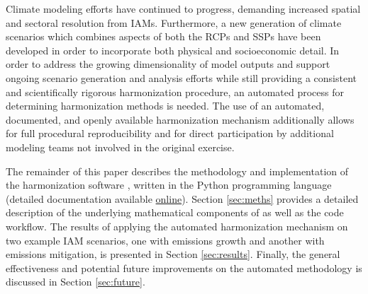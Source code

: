 Climate modeling efforts have continued to progress, demanding increased spatial
and sectoral resolution from IAMs. Furthermore, a new generation of climate
scenarios which combines aspects of both the RCPs and SSPs have been developed
in order to incorporate both physical and socioeconomic detail. In order to
address the growing dimensionality of model outputs and support ongoing scenario
generation and analysis efforts while still providing a consistent and
scientifically rigorous harmonization procedure, an automated process for
determining harmonization methods is needed. The use of an automated,
documented, and openly available harmonization mechanism additionally allows for
full procedural reproducibility and for direct participation by additional
modeling teams not involved in the original exercise.

The remainder of this paper describes the methodology and implementation of the
harmonization software  \cite{matthew_gidden_2017_802832}, written
in the Python programming language (detailed documentation available
\href{http://mattgidden.com/aneris/}{online}). Section \ref{sec:meths} provides
a detailed description of the underlying mathematical components of
 as well as the code workflow. The results of applying the
automated harmonization mechanism on two example IAM scenarios, one with
emissions growth and another with emissions mitigation, is presented in Section
\ref{sec:results}. Finally, the general effectiveness and potential future
improvements on the automated methodology is discussed in Section
\ref{sec:future}.
